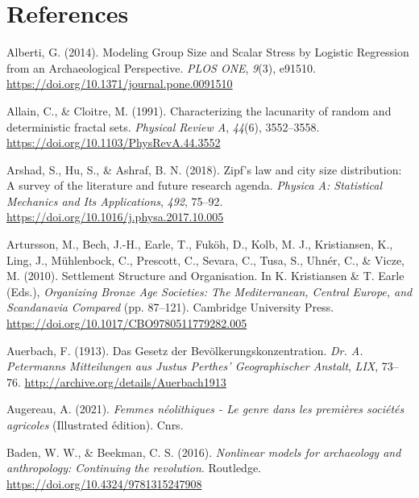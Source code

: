 \documentclass[
  12pt,
]{book}
\newlength{\cslhangindent}
\newlength{\cslentryspacingunit} %
\newenvironment{CSLReferences}[2] %
 {%
  \setlength{\parindent}{0pt}
  \ifodd #1
  \let\oldpar\par
  \def\par{\hangindent=\cslhangindent\oldpar}
  \fi
  \setlength{\parskip}{#2\cslentryspacingunit}
 }%
 {}
\begin{document}
\hypertarget{refs}{}
\begin{CSLReferences}{1}{0}
\hypertarget{references}{%
\chapter*{References}\label{references}}

\leavevmode{}%
Alberti, G. (2014). Modeling Group Size and Scalar Stress by Logistic Regression from an Archaeological Perspective. \emph{PLOS ONE}, \emph{9}(3), e91510. \url{https://doi.org/10.1371/journal.pone.0091510}

\leavevmode{}%
Allain, C., \& Cloitre, M. (1991). Characterizing the lacunarity of random and deterministic fractal sets. \emph{Physical Review A}, \emph{44}(6), 3552--3558. \url{https://doi.org/10.1103/PhysRevA.44.3552}

\leavevmode{}%
Arshad, S., Hu, S., \& Ashraf, B. N. (2018). Zipf{'}s law and city size distribution: A survey of the literature and future research agenda. \emph{Physica A: Statistical Mechanics and Its Applications}, \emph{492}, 75--92. \url{https://doi.org/10.1016/j.physa.2017.10.005}

\leavevmode{}%
Artursson, M., Bech, J.-H., Earle, T., Fuköh, D., Kolb, M. J., Kristiansen, K., Ling, J., Mühlenbock, C., Prescott, C., Sevara, C., Tusa, S., Uhnér, C., \& Vicze, M. (2010). Settlement {Structure} and {Organisation}. In K. Kristiansen \& T. Earle (Eds.), \emph{Organizing {Bronze Age Societies}: {The Mediterranean}, {Central Europe}, and {Scandanavia Compared}} (pp. 87--121). {Cambridge University Press}. \url{https://doi.org/10.1017/CBO9780511779282.005}

\leavevmode{}%
Auerbach, F. (1913). Das Gesetz der Bevölkerungskonzentration. \emph{Dr. A. Petermanns Mitteilungen aus Justus Perthes' Geographischer Anstalt}, \emph{LIX}, 73--76. \url{http://archive.org/details/Auerbach1913}

\leavevmode{}%
Augereau, A. (2021). \emph{Femmes néolithiques - Le genre dans les premières sociétés agricoles} (Illustrated édition). Cnrs.

\leavevmode{}%
Baden, W. W., \& Beekman, C. S. (2016). \emph{Nonlinear models for archaeology and anthropology: Continuing the revolution}. Routledge. \url{https://doi.org/10.4324/9781315247908}


\end{CSLReferences}
\end{document}

